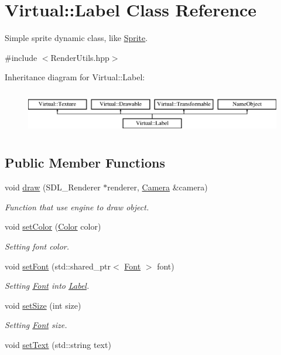 \hypertarget{class_virtual_1_1_label}{}\section{Virtual\+:\+:Label Class Reference}
\label{class_virtual_1_1_label}


Simple sprite dynamic class, like \hyperlink{class_virtual_1_1_sprite}{Sprite}.  




{\ttfamily \#include $<$Render\+Utils.\+hpp$>$}

Inheritance diagram for Virtual\+:\+:Label\+:\begin{figure}[H]
\begin{center}
\leavevmode
\includegraphics[height=1.944445cm]{class_virtual_1_1_label}
\end{center}
\end{figure}
\subsection*{Public Member Functions}
\begin{DoxyCompactItemize}
\item 
void \hyperlink{class_virtual_1_1_label_aaea754974570ba425d2b9ffe91d183c7}{draw} (S\+D\+L\+\_\+\+Renderer $\ast$renderer, \hyperlink{class_virtual_1_1_camera}{Camera} \&camera)
\begin{DoxyCompactList}\small\item\em Function that use engine to draw object. \end{DoxyCompactList}\item 
void \hyperlink{class_virtual_1_1_label_adf4f738abab5dca3815a9c6f4124eec6}{set\+Color} (\hyperlink{struct_virtual_1_1_color}{Color} color)
\begin{DoxyCompactList}\small\item\em Setting font color. \end{DoxyCompactList}\item 
void \hyperlink{class_virtual_1_1_label_a643dca9416c60c78b1b1fc234ed6964c}{set\+Font} (std\+::shared\+\_\+ptr$<$ \hyperlink{class_virtual_1_1_font}{Font} $>$ font)
\begin{DoxyCompactList}\small\item\em Setting \hyperlink{class_virtual_1_1_font}{Font} into \hyperlink{class_virtual_1_1_label}{Label}. \end{DoxyCompactList}\item 
void \hyperlink{class_virtual_1_1_label_a20e22a03b54b9851ad675c491df1ae75}{set\+Size} (int size)
\begin{DoxyCompactList}\small\item\em Setting \hyperlink{class_virtual_1_1_font}{Font} size. \end{DoxyCompactList}\item 
void \hyperlink{class_virtual_1_1_label_a1b737a96ea06f214120c61dc2465536f}{set\+Text} (std\+::string text)
\end{DoxyCompactItemize}
